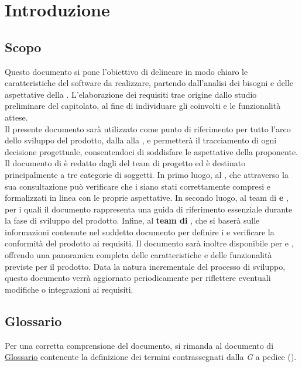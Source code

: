 \tableofcontents
\newpage
\listoftables
\newpage
\listoffigures
\newpage

\section{Introduzione}

\subsection{Scopo}
Questo documento si pone l'obiettivo di delineare in modo chiaro le caratteristiche del software da realizzare, partendo dall'analisi dei bisogni e delle aspettative della .
L'elaborazione dei requisiti trae origine dallo studio preliminare del capitolato, al fine di individuare gli  coinvolti e le funzionalità attese.\\
 
\noindent Il presente documento sarà utilizzato come punto di riferimento per tutto l'arco dello sviluppo del prodotto, dalla  alla , e permetterà il tracciamento di ogni decisione progettuale, consentendoci di soddisfare le aspettative della proponente.\\

\noindent Il documento di  è redatto dagli  del team di progetto ed è destinato principalmente a tre categorie di soggetti.
In primo luogo, al , che attraverso la sua consultazione può verificare che i  siano stati correttamente compresi e formalizzati in linea con le proprie aspettative.
In secondo luogo, al team di \textbf{ e }, per i quali il documento rappresenta una guida di riferimento essenziale durante la fase di sviluppo del prodotto.
Infine, al \textbf{team di }, che si baserà sulle informazioni contenute nel suddetto documento per definire i  e verificare la conformità del prodotto ai requisiti.
Il documento sarà inoltre disponibile per  e , offrendo una panoramica completa delle caratteristiche e delle funzionalità previste per il prodotto.
Data la natura incrementale del processo di sviluppo, questo documento verrà aggiornato periodicamente per riflettere eventuali modifiche o integrazioni ai requisiti.

\subsection{Glossario}
Per una corretta comprensione del documento, si rimanda al documento di \href{https://7-zpus.github.io/Docs/assets/2_RTB/DocumentiInterni/Glossario.pdf}{\ul{Glossario}} contenente la definizione dei termini contrassegnati dalla \textit{G} a pedice ().

